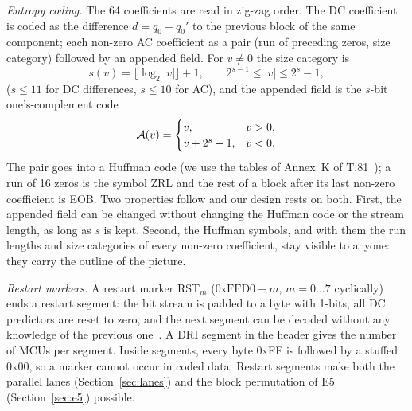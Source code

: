 \textit{Entropy coding.} The 64 coefficients are read in zig-zag order. The DC coefficient is coded as the difference $d = q_0 - q_0'$ to the previous block of the same component; each non-zero AC coefficient as a pair (run of preceding zeros, size category) followed by an appended field. For $v \ne 0$ the size category is
\begin{equation}
s(v) = \lfloor \log_2 |v| \rfloor + 1, \qquad 2^{s-1} \le |v| \le 2^s - 1,
\label{eq:size}
\end{equation}
($s \le 11$ for DC differences, $s \le 10$ for AC), and the appended field is the $s$-bit one's-complement code
\begin{equation}
\mathcal{A}(v) = \begin{cases} v, & v > 0,\\ v + 2^s - 1, & v < 0. \end{cases}
\label{eq:amp}
\end{equation}
The pair goes into a Huffman code (we use the tables of Annex~K of T.81~\cite{t81,wallace1992}); a run of 16 zeros is the symbol ZRL and the rest of a block after its last non-zero coefficient is EOB. Two properties follow and our design rests on both. First, the appended field can be changed without changing the Huffman code or the stream length, as long as $s$ is kept. Second, the Huffman symbols, and with them the run lengths and size categories of every non-zero coefficient, stay visible to anyone: they carry the outline of the picture.

\textit{Restart markers.} A restart marker RST$_m$ ($\mathrm{0xFFD0} + m$, $m = 0 \ldots 7$ cyclically) ends a restart segment: the bit stream is padded to a byte with 1-bits, all DC predictors are reset to zero, and the next segment can be decoded without any knowledge of the previous one~\cite{t81}. A DRI segment in the header gives the number of MCUs per segment. Inside segments, every byte 0xFF is followed by a stuffed 0x00, so a marker cannot occur in coded data. Restart segments make both the parallel lanes (Section~\ref{sec:lanes}) and the block permutation of E5 (Section~\ref{sec:e5}) possible.


